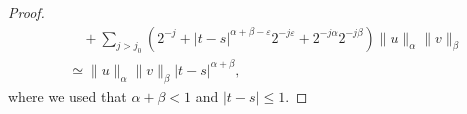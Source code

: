 \documentclass[11pt,a4paper]{article}
\theoremstyle{remark}
\begin{document}
\begin{proof}
\begin{align*}
     &\quad + \sum_{j>j_{0}} ( 2^{-j} + | t-s |^{\alpha + \beta - \varepsilon} 2^{-j \varepsilon} +2^{-j \alpha} 2^{-j \beta} ) \| u \|_{\alpha} \| v \|_{\beta} \\
     & \simeq \| u \|_{\alpha} \| v \|_{\beta} | t-s |^{\alpha + \beta},
  \end{align*}
  where we used that $\alpha + \beta <1$ and $| t-s | \leqslant 1$.
\end{proof}




%
%
%
%
\end{document}
